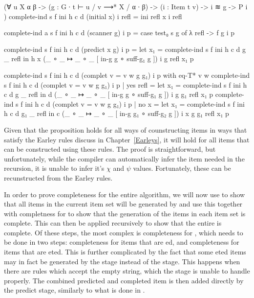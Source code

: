 		\begin{code}
			    (∀ {u X α β} ->
			      (g : G ∙ t ⊢ u / v ⟶* X / α ∙ β) ->
			      (i : Item t v) ->
			      i ≋ g ->
			      P i
			    )
			  complete-ind s f ini h c d (initial x) i refl =
			    ini refl x i refl
			
			  complete-ind {a} s f ini h c d (scanner g) i p =
			    case test₀ s g of λ {refl -> f g i p}
			
			  complete-ind s f ini h c d (predict x g) i p =
			    let x₁ = complete-ind s f ini h c d g _ refl in
			    h x (_ ∘ _ ↦ _ ∘ _ [ in-g g ∘ suff-g₁ g ]) i g refl x₁ p
			
			  complete-ind s f ini h c d (complet {v = v} {w} g g₁) i p with eq-T* v w
			  complete-ind s f ini h c d (complet {v = v} {w} g g₁) i p | yes refl =
			    let x₁ = complete-ind s f ini h c d g _ refl in
			    d (_ ∘ _ ↦ _ ∘ _ [ in-g g ∘ suff-g₁ g ]) i g g₁ refl x₁ p
			  complete-ind s f ini h c d (complet {v = v} {w} g g₁) i p | no x =
			    let x₁ = complete-ind s f ini h c d g₁ _ refl in
			    c (_ ∘ _ ↦ _ ∘ _ [ in-g g₁ ∘ suff-g₂ g ]) i x g g₁ refl x₁ p
		\end{code}

		Given that the proposition holds for all ways of counstructing items in
		ways that satisfy the Earley rules discuss in Chapter~\ref{Earleys}, it
		will hold for all items that can be constructed using these rules. The
		proof is straightforward, but unfortunately, while the compiler can
		automatically infer the item needed in the recursion, it is unable to
		infer it's $\chi$ and $\psi$ values. Fortunately, these can be
		recunstructed from the Earley rules.

		In order to prove completeness for the entire algorithm, we will now
		use  to show that all items in the current item
		set will be generated by  and use this together with
		completness for  to show that the generation of the items
		in each item set is complete. This can then be applied recursively to
		show that the entire  is complete. Of these steps, the
		most complex is completeness for , which needs to be
		done in two steps: completeness for items that are ed,
		and completeness for items that are eted. This is further
		complicated by the fact that some eted items may in fact
		be generated by the  stage instead of the
		 stage. This happens when there are rules which accept
		the empty string, which the  stage is unable to handle
		properly. The combined predicted and completed item is then added
		directly by the predict stage, similarly to what is done in
		\cite{aycock02}.

